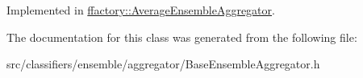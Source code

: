 Implemented in \hyperlink{classffactory_1_1_average_ensemble_aggregator_acfdd35393c0e5db156573a237a025f11}{ffactory\-::\-Average\-Ensemble\-Aggregator}.



The documentation for this class was generated from the following file\-:\begin{DoxyCompactItemize}
\item 
src/classifiers/ensemble/aggregator/Base\-Ensemble\-Aggregator.\-h\end{DoxyCompactItemize}

